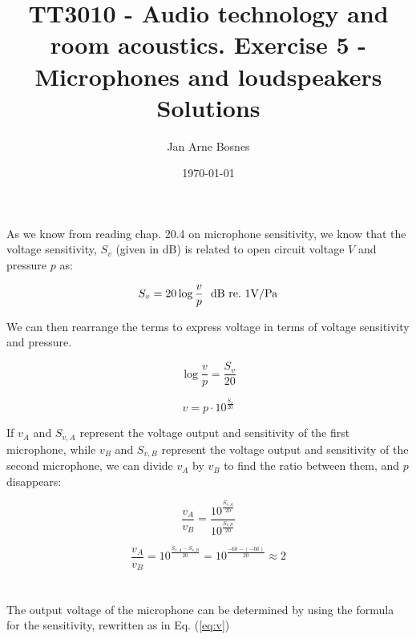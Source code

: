 \documentclass{article}
\title{TT3010 - Audio technology and room acoustics. \newline Exercise 5 - Microphones and loudspeakers \newline Solutions}
\author{Jan Arne Bosnes}
\date{\today}
\begin{document}
\maketitle




\section{}

As we know from reading chap. 20.4 on microphone sensitivity, we know that the voltage sensitivity, $S_v$ (given in dB) is related to open circuit voltage $V$ and pressure $p$ as:

\begin{equation*}
    S_v = 20 \log{\frac{v}{p}} {\rm\ \  dB\ re.\ 1 V/Pa}
\end{equation*}

We can then rearrange the terms to express voltage in terms of voltage sensitivity and pressure.

\begin{equation*}
    \log{\frac{v}{p}}=\frac{S_v}{20}
\end{equation*}

\begin{equation}
    v=p\cdot 10^{\frac{S_v}{20}}
\label{eq:v}
\end{equation}

If $v_A$ and $S_{v,A}$ represent the voltage output and sensitivity of the first microphone, while $v_B$ and $S_{v,B}$ represent the voltage output and sensitivity of the second microphone, we can divide $v_A$ by $v_B$ to find the ratio between them, and $p$ disappears:

\begin{equation*}
    \frac{v_A}{v_B}=\frac{10^{\frac{S_{v,A}}{20}}}{10^{\frac{S_{v,B}}{20}}}
\end{equation*}

\begin{equation*}
    \frac{v_A}{v_B}=10^{\frac{S_{v,A}-S_{v,B}}{20}} = 10^{\frac{-60-(-66)}{20}} \approx 2
\end{equation*}

\section{}

The output voltage of the microphone can be determined by using the formula for the sensitivity, rewritten as in Eq. (\ref{eq:v})
\end{document}
